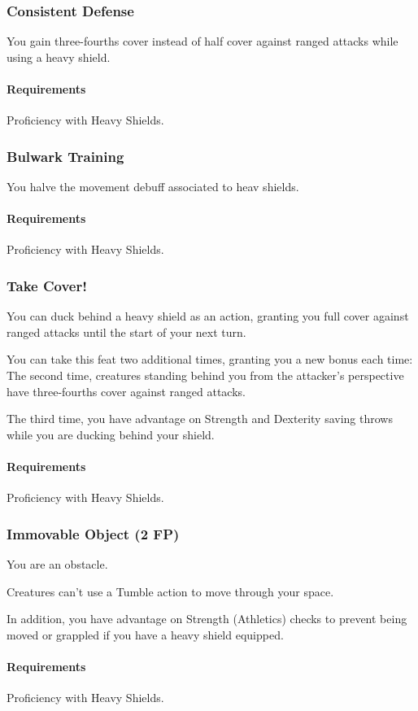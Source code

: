 \subsubsection{Consistent Defense} \label{feat::consistentefense}
    You gain three-fourths cover instead of half cover against ranged attacks while using a heavy shield.
    \paragraph{Requirements} Proficiency with Heavy Shields.
\subsubsection{Bulwark Training} \label{feat::bulwarktraining}
    You halve the movement debuff associated to heav shields.
    \paragraph{Requirements} Proficiency with Heavy Shields.
\subsubsection{Take Cover!} \label{feat::takecover}
    You can duck behind a heavy shield as an action, granting you full cover against ranged attacks until the start of your next turn.

    You can take this feat two additional times, granting you a new bonus each time:
    The second time, creatures standing behind you from the attacker's perspective have three-fourths cover against ranged attacks.

    The third time, you have advantage on Strength and Dexterity saving throws while you are ducking behind your shield.
    \paragraph{Requirements} Proficiency with Heavy Shields.
\subsubsection{Immovable Object (2 FP)} \label{feat::immovableobject}
    You are an obstacle.

    Creatures can't use a Tumble action to move through your space.

    In addition, you have advantage on Strength (Athletics) checks to prevent being moved or grappled if you have a heavy shield equipped.
    \paragraph{Requirements} Proficiency with Heavy Shields.

